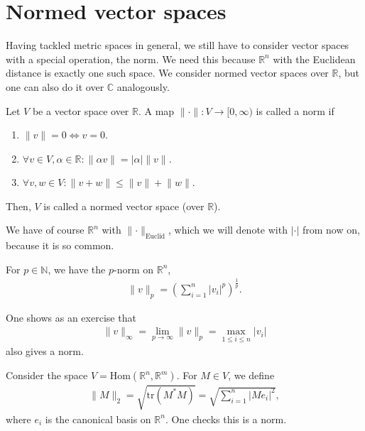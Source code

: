 \section{Normed vector spaces}

Having tackled metric spaces in general, we still have to consider vector spaces with a special operation, the norm. We need this because $\mathbb{R}^{n}$ with the Euclidean distance is exactly one such space. We consider normed vector spaces over $\mathbb{R}$, but one can also do it over $\mathbb{C}$ analogously. 

\begin{definition}\label{def:normed_vs}
    Let $V$ be a vector space over $\mathbb{R}$. A map $\lVert \cdot  \rVert: V \to [0,\infty)$ is called a norm if 
    \begin{enumerate} 
        \item $\lVert v \rVert = 0 \iff v = 0$.
        \item $\forall v \in V, \alpha \in \mathbb{R}: \lVert \alpha v \rVert = \left| \alpha \right| \lVert v \rVert$.
        \item $\forall v,w \in V: \lVert v+w \rVert \leq \lVert v \rVert + \lVert w \rVert$.
    \end{enumerate}
    Then, $V$ is called a normed vector space (over $\mathbb{R}$).
\end{definition}

\begin{eg} 
    We have of course $\mathbb{R}^{n}$ with $\lVert \cdot  \rVert_{\text{Euclid}}$, which we will denote with $\left| \cdot  \right|$ from now on, because it is so common. 

    For $p \in \mathbb{N}$, we have the $p$-norm on $\mathbb{R}^{n}$,
    \begin{align*}
        \lVert v \rVert_{p} = \left( \sum_{i=1}^{n} \left| v_{i} \right|^{p} \right)^{\frac{1}{p}}.
    \end{align*}

    One shows as an exercise that
    \begin{align*}
        \lVert v \rVert_{\infty} = \lim_{p \to \infty} \lVert v \rVert_{p} = \max_{1 \leq i \leq n} \left| v_{i} \right|
    \end{align*}
    also gives a norm.
\end{eg}

\begin{definition}\label{def:hilbert-schmidt-norm}
    Consider the space $V = \text{Hom}(\mathbb{R}^{n}, \mathbb{R}^{m})$. For $M \in V$, we define
    \begin{align*}
        \lVert M \rVert_{2} = \sqrt{ \text{tr}(M^* M)} = \sqrt{\sum_{i=1}^{n} \left| Me_{i} \right|^{2}},
    \end{align*} 
    where $e_{i}$ is the canonical basis on $\mathbb{R}^{n}$. One checks this is a norm.
\end{definition}

